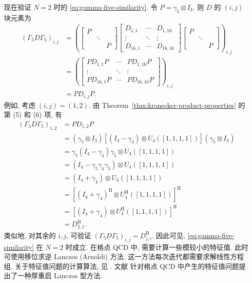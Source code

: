 {现在验证 $N=2$ 时的 \eqref{eq:gamma-five-similarity}. 令 $P=\gamma_5\otimes I_3$. 则 $D$ 的 $(i,j)$ 块元素为}
\[\begin{aligned}
(\Gamma_5D\Gamma_5)_{i,j}
&=\left(\begin{bmatrix}P&&\\&\ddots&\\&&P\end{bmatrix}
\begin{bmatrix}D_{1,1}&\cdots&D_{1,16}\\\vdots&\ddots&\vdots\\D_{16,1}&\cdots&D_{16,16}\end{bmatrix}
\begin{bmatrix}P&&\\&\ddots&\\&&P\end{bmatrix}\right)_{i,j}\\
&=\left(\begin{bmatrix}PD_{1,1}P&\cdots&PD_{1,16}P\\\vdots&\ddots&\vdots\\PD_{16,1}P&\cdots&PD_{16,16}P\end{bmatrix}\right)_{i,j}\\
&=PD_{i,j}P.
\end{aligned}\]
{例如, 考虑 $(i,j)=(1,2)$. 由 Theorem\ \ref{thm:kronecker-product-properties} 的第 (5) 和 (6) 项, 有}
\[\begin{aligned}
(\Gamma_5D\Gamma_5)_{1,2}&=PD_{1,2}P\\
&=(\gamma_5\otimes I_3)[(I_4-\gamma_4)\otimes U_4([1,1,1,1])](\gamma_5\otimes I_3)\\
&=\gamma_5(I_4-\gamma_4)\gamma_5\otimes U_4([1,1,1,1])\\
&=(I_4-\gamma_5\gamma_4\gamma_5)\otimes U_4([1,1,1,1])\\
&=(I_4+\gamma_4)\otimes U_4([1,1,1,1])\\
&=[(I_4+\gamma_4)^{\mathrm H}\otimes U_4^{\mathrm H}([1,1,1,1])]^{\mathrm H}\\
&=[(I_4+\gamma_4)\otimes U_4^{\mathrm H}([1,1,1,1])]^{\mathrm H}\\
&=D_{2,1}^{\mathrm H}.
\end{aligned}\]
{类似地, 对其余的 $i,j$, 可验证 $(\Gamma_5D\Gamma_5)_{i,j}=D_{j,i}^{\mathrm H}$. 因此可见, \eqref{eq:gamma-five-similarity} 在 $N=2$ 时成立. 在格点 QCD 中, 需要计算一些模较小的特征值. 此时可使用移位求逆 Lanczos (Arnoldi) 方法. 这一方法每次迭代都需要求解线性方程组. 关于特征值问题的计算算法, 见 . 文献  针对格点 QCD 中产生的特征值问题提出了一种厚重启 Lanczos 型方法.}
